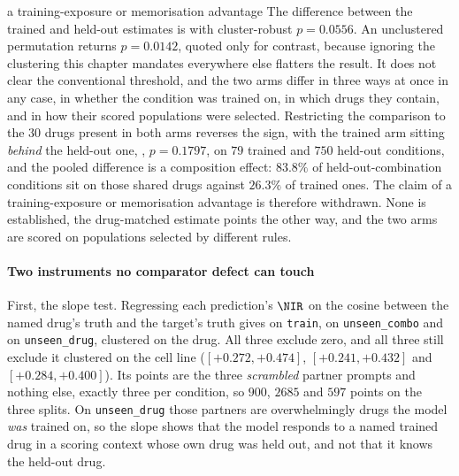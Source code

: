 %
\begin{withdrawn}{a training-exposure or memorisation advantage}
The difference between the trained and held-out estimates is
 with cluster-robust $p = 0.0556$. An unclustered
permutation returns $p = 0.0142$, quoted only for contrast, because ignoring the
clustering this chapter mandates everywhere else flatters the result. It does
not clear the conventional threshold, and the two arms differ in three ways at
once in any case, in whether the condition was trained on, in which drugs they
contain, and in how their scored populations were selected. Restricting the
comparison to the $30$ drugs present in both arms reverses the sign, with the
trained arm sitting \emph{behind} the held-out one,
, $p = 0.1797$, on $79$ trained and $750$
held-out conditions, and the pooled difference is a composition effect: $83.8\%$
of held-out-combination conditions sit on those shared drugs against $26.3\%$
of trained ones. The claim of a training-exposure or memorisation advantage is
therefore withdrawn. None is established, the drug-matched estimate points the
other way, and the two arms are scored on populations selected by different
rules.
\end{withdrawn}

\paragraph{Two instruments no comparator defect can touch} First, the slope test.
Regressing each prediction's $\NIR$ on the cosine between the named drug's truth
and the target's truth gives  on \texttt{train},
 on \texttt{unseen\_combo} and
 on \texttt{unseen\_drug}, clustered on the drug. All
three exclude zero, and all three still exclude it clustered on the cell line
($[+0.272, +0.474]$, $[+0.241, +0.432]$ and $[+0.284, +0.400]$). Its points are
the three \emph{scrambled} partner prompts and nothing else, exactly three per
condition, so $900$, $\num{2685}$ and $597$ points on the three splits. On
\texttt{unseen\_drug} those partners are overwhelmingly drugs the model
\emph{was} trained on, so the slope shows that the model responds to a named
trained drug in a scoring context whose own drug was held out, and not that it
knows the held-out drug.

